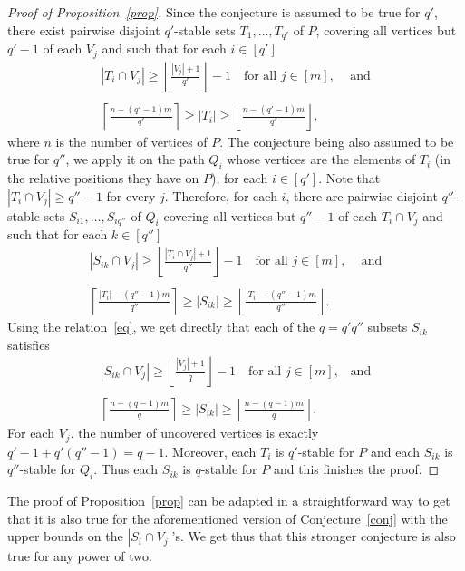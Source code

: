 \documentclass[12pt]{amsart}
\theoremstyle{remark}
\def\ds{\displaystyle}
\begin{document}
\begin{proof}[Proof of Proposition~\ref{prop}]
 Since the conjecture is assumed to be true for $q'$, there exist pairwise disjoint $q'$-stable sets $T_1,\ldots,T_{q'}$ of $P$, covering all vertices but $q'-1$ of each $V_j$ and such that for each $i\in[q']$
$$\begin{array}{l}
\ds{|T_i\cap V_j| \geq \left\lfloor  \frac{|V_j|+1} {q'} \right\rfloor-1}\quad\mbox{for all $j\in[m]$,}\quad\mbox{ and}\\ \\
\ds{\left\lceil \frac{n-(q'-1)m} {q'}\right\rceil \geq |T_i| \geq  \left\lfloor \frac{n-(q'-1)m} {q'}\right\rfloor,}
\end{array}$$ where $n$ is the number of vertices of $P$.
The conjecture being also assumed to be true for $q''$, we apply it on the path $Q_i$ whose vertices are the elements of $T_i$ (in the relative positions they have on $P$), for each $i\in[q']$. Note that $|T_i\cap V_j|\geq q''-1$ for every $j$. Therefore, for each $i$, there are pairwise disjoint $q''$-stable sets $S_{i1},\ldots,S_{iq''}$ of $Q_i$ covering all vertices but $q''-1$ of each $T_i\cap V_j$ and such that for each $k\in[q'']$ 
$$\begin{array}{l}
\ds{|S_{ik}\cap V_j| \geq \left\lfloor \frac{|T_i\cap V_j|+1} {q''} \right\rfloor-1}\quad\mbox{for all $j\in[m]$,}\quad\mbox{ and}\\ \\
\ds{\left\lceil \frac{|T_i|-(q''-1)m} {q''}\right\rceil \geq |S_{ik}| \geq  \left\lfloor \frac{|T_i|-(q''-1)m} {q''}\right\rfloor.}
\end{array}$$
Using the relation~\eqref{eq}, we get directly that each of the $q=q'q''$ subsets $S_{ik}$ satisfies
$$\begin{array}{l}
\ds{ |S_{ik}\cap V_j| \geq\left\lfloor \frac{|V_j|+1} q \right\rfloor-1}\quad\mbox{for all $j\in[m]$,}\quad\mbox{and}\\ \\
\ds{\left\lceil \frac{n-(q-1)m} q\right\rceil \geq |S_{ik}| \geq  \left\lfloor \frac{n-(q-1)m} q\right\rfloor.}
\end{array}$$
For each $V_j$, the number of uncovered vertices is exactly $q'-1+q'(q''-1)=q-1$. Moreover, each $T_i$ is $q'$-stable for $P$ and each $S_{ik}$ is $q''$-stable for $Q_i$. Thus each $S_{ik}$ is $q$-stable for $P$ and this finishes the proof.
\end{proof}

The proof of Proposition~\ref{prop} can be adapted in a straightforward way to get that it is also true for the aforementioned version of Conjecture~\ref{conj} with the upper bounds on the $|S_i\cap V_j|$'s. We get thus that this stronger conjecture is also true for any power of two. 
\end{document}
